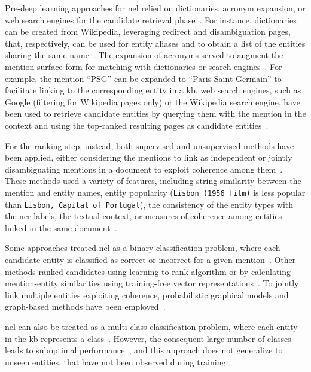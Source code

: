 Pre-deep learning approaches for \ac{nel} relied on dictionaries, acronym expansion, or web search engines for the candidate retrieval phase~\cite{entity_linking_with_kb_2015}.
For instance, dictionaries can be created from Wikipedia, leveraging redirect and disambiguation pages, that, respectively, can be used for entity aliases and to obtain a list of the entities sharing the same name~\cite{entity_linking_with_kb_2015}.
The expansion of acronyms served to augment the mention surface form for matching with dictionaries or search engines~\cite{entity_linking_with_kb_2015}. For example, the mention ``PSG'' can be expanded to ``Paris Saint-Germain'' to facilitate linking to the corresponding entity in a \ac{kb}. web search engines, such as Google (filtering for Wikipedia pages only) or the Wikipedia search engine, have been used to retrieve candidate entities by querying them with the mention in the context and using the top-ranked resulting pages as candidate entities~\cite{entity_linking_with_kb_2015}.

For the ranking step, instead, both supervised and unsupervised methods have been applied, either considering the mentions to link as independent or jointly disambiguating mentions in a document to exploit coherence among them~\cite{entity_linking_with_kb_2015}. These methods used a variety of features, including string similarity between the mention and entity names, entity popularity (\eg \texttt{Lisbon (1956 film)} is less popular than \texttt{Lisbon, Capital of Portugal}), the consistency of the entity types with the \acl{ner} labels, the textual context, or measures of coherence among entities linked in the same document~\cite{entity_linking_with_kb_2015}.

Some approaches treated \ac{nel} as a binary classification problem, where each candidate entity is classified as correct or incorrect for a given mention~\cite{entity_linking_with_kb_2015}. Other methods ranked candidates using learning-to-rank algorithm or by calculating mention-entity similarities using training-free vector representations~\cite{entity_linking_with_kb_2015}. To jointly link multiple entities exploiting coherence, probabilistic graphical models and graph-based methods have been employed~\cite{entity_linking_with_kb_2015}.

\ac{nel} can also be treated as a multi-class classification problem, where each entity in the \ac{kb} represents a class~\cite{kar2018task}. However, the consequent large number of classes leads to suboptimal performance~\cite{Sevgili2022NeuralEL}, and this approach does not generalize to unseen entities, that have not been observed during training.

